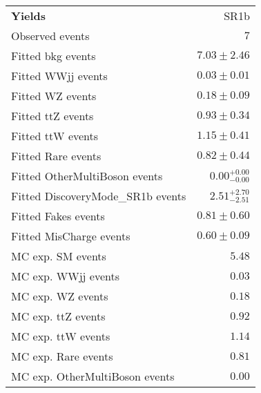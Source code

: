 \begin{table}
\begin{center}
\setlength{\tabcolsep}{0.0pc}
{\small
\begin{tabular*}{\textwidth}{@{\extracolsep{\fill}}lr}
\noalign{\smallskip}\hline\noalign{\smallskip}
{\bf Yields}           & SR1b              \\[-0.05cm]
\noalign{\smallskip}\hline\noalign{\smallskip}
Observed events          & $7$                    \\
\noalign{\smallskip}\hline\noalign{\smallskip}
Fitted bkg events         & $7.03 \pm 2.46$              \\
\noalign{\smallskip}\hline\noalign{\smallskip}
        Fitted WWjj events         & $0.03 \pm 0.01$              \\
        Fitted WZ events         & $0.18 \pm 0.09$              \\
        Fitted ttZ events         & $0.93 \pm 0.34$              \\
        Fitted ttW events         & $1.15 \pm 0.41$              \\
        Fitted Rare events         & $0.82 \pm 0.44$              \\
        Fitted OtherMultiBoson events         & $0.00_{-0.00}^{+0.00}$              \\
        Fitted DiscoveryMode\_SR1b events         & $2.51_{-2.51}^{+2.70}$              \\
        Fitted Fakes events         & $0.81 \pm 0.60$              \\
        Fitted MisCharge events         & $0.60 \pm 0.09$              \\
 \noalign{\smallskip}\hline\noalign{\smallskip}
MC exp. SM events              & $5.48$              \\
\noalign{\smallskip}\hline\noalign{\smallskip}
        MC exp. WWjj events         & $0.03$              \\
        MC exp. WZ events         & $0.18$              \\
        MC exp. ttZ events         & $0.92$              \\
        MC exp. ttW events         & $1.14$              \\
        MC exp. Rare events         & $0.81$              \\
        MC exp. OtherMultiBoson events         & $0.00$              \\

\end{tabular*}}
\end{center}
\end{table}
